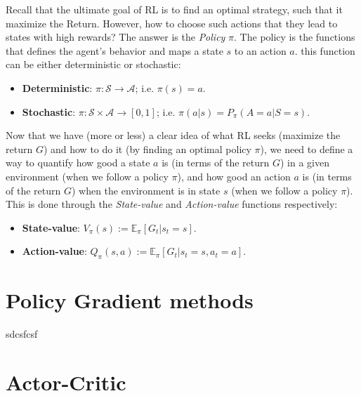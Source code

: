 \documentclass[twoside,twocolumn]{article}
\begin{document}
Recall that the ultimate goal of RL is to find an optimal strategy, such that it maximize the Return. However, how to choose such actions that they lead to states with high rewards? The answer is the \emph{Policy} $\pi$. The policy is the functions that defines the agent’s behavior and maps a state $s$ to an action $a$. this function can be either deterministic or stochastic:

\begin{itemize}
  \item \textbf{Deterministic}: $\pi: \mathcal{S} \rightarrow \mathcal{A}$; i.e. $\pi(s)=a$.
  \item \textbf{Stochastic}: $\pi: \mathcal{S} \times \mathcal{A} \rightarrow [0, 1]$; i.e. $\pi(a|s)=P_{\pi}(A=a|S=s)$.
\end{itemize}

Now that we have (more or less) a clear idea of what RL seeks (maximize the return $G$) and how to do it (by finding an optimal policy $\pi$), we need to define a way to quantify how good a state $a$ is (in terms of the return $G$) in a given environment (when we follow a policy $\pi$), and how good an action $a$ is (in terms of the return $G$) when the environment is in state $s$ (when we follow a policy $\pi$). This is done through the \emph{State-value} and \emph{Action-value} functions respectively:
\begin{itemize}
    \item \textbf{State-value}: $V_{\pi}(s):= \mathbb{E}_{\pi}[G_t|s_t=s]$.
    \item \textbf{Action-value}: $Q_{\pi}(s, a):= \mathbb{E}_{\pi}[G_t|s_t=s, a_t=a]$.
\end{itemize}


\section{Policy Gradient methods}
sdcsfcsf


\section{Actor-Critic}
\end{document}
